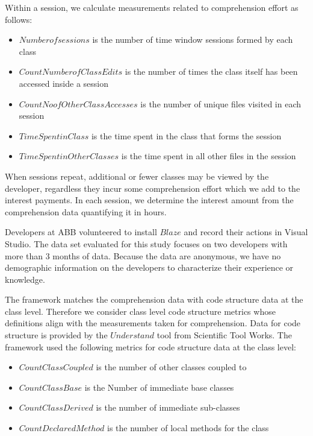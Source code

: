 Within a session, we calculate measurements related to comprehension effort as follows:
\begin{itemize}
	\item[] $Number of sessions$ is the number of time window sessions formed by each class 
	\item[] $Count Number of Class Edits$ is the number of times the class itself has been accessed inside a session 
	\item[] $Count No of Other Class Accesses$ is the number of unique files visited in each session
	\item[] $Time Spent in Class$ is the time spent in the class that forms the session
	\item[] $Time Spent in Other Classes$ is the time spent in all other files in the session
\end{itemize}

When sessions repeat, additional or fewer classes may be viewed by the developer, regardless they incur some comprehension effort which we add to the interest payments.  In each session, we determine the interest amount from the comprehension data quantifying it in hours. 

Developers at ABB volunteered to install $Blaze$ and record their actions in Visual Studio.  The data set evaluated for this study focuses on two developers with more than 3 months of data.  Because the data are anonymous, we have no demographic information on the developers to characterize their experience or knowledge.

The framework matches the comprehension data with code structure data at the class level.  Therefore we consider class level code structure metrics whose definitions align with the measurements taken for comprehension.  Data for code structure is provided by the $Understand$ tool from Scientific Tool Works.  The framework used the following metrics for code structure data at the class level:

\begin{itemize}
	\item[] $Count Class Coupled$ is the number of other classes coupled to
	\item[] $Count Class Base$ is the Number of immediate base classes
	\item[] $Count Class Derived$ is the number of immediate sub-classes
	\item[] $Count Declared Method$ is the number of local methods for the class
\end{itemize}

